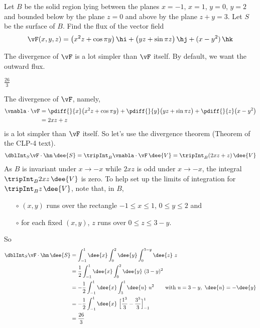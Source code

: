 \begin{question}[M317 2006A] %
Let $B$ be the solid region lying between the planes $x=-1$,
$x=1$, $y=0$, $y=2$ and bounded below by the plane $z=0$ and above 
by the plane $z+y=3$. Let $S$ be the surface of $B$. Find the flux 
of the vector field
\begin{equation*}
\vF(x,y,z) =  \big(x^2 z +\cos \pi y\big)\,\hi
             +\big(yz +\sin \pi z\big)\,\hj
             +(x-y^2)\,\hk
\end{equation*}
\end{question}

\begin{hint} 
The divergence of $\vF$ is a lot simpler than $\vF$ itself.
By default, we want the outward flux.
\end{hint}

\begin{answer} 
$\frac{26}{3}$
\end{answer}

\begin{solution}
The divergence of $\vF$, namely,
\begin{align*}
\vnabla\cdot\vF &= 
    \pdiff{}{x}\big(x^2 z +\cos \pi y\big)
     +\pdiff{}{y}\big(yz +\sin \pi z\big)
     +\pdiff{}{z}\big(x-y^2\big) \\
  &=2xz +z
\end{align*}
is a lot simpler than $\vF$ itself. So let's use the divergence theorem
(Theorem  of the CLP-4 text). 
\begin{align*}
\dblInt_S \vF \cdot \hn\,\dee{S}
=\tripInt_B \vnabla\cdot\vF\,\dee{V}
=\tripInt_B (2xz+z)\,\dee{V}
\end{align*}
As $B$ is invariant under $x\rightarrow-x$ while $2xz$ is odd under 
$x\rightarrow-x$, the integral $\tripInt_B 2xz\,\dee{V}$ is zero.
To help set up the limits of integration for $\tripInt_B z\,\dee{V}$,
note that, in $B$,
\begin{itemize}\itemsep1pt \parskip0pt  %
\item[$\circ$]
$(x,y)$ runs over the rectangle $-1\le x\le 1$, $0\le y\le 2$ and
\item[$\circ$]
for each fixed $(x,y)$, $z$ runs over $0\le z\le 3-y$.
\end{itemize}
So
\begin{align*}
\dblInt_S \vF \cdot \hn\,\dee{S}
&= \int_{-1}^1\dee{x}\int_0^2\dee{y}\int_0^{3-y}\dee{z}\ z \\
&= \frac{1}{2}\int_{-1}^1\dee{x}\int_0^2\dee{y}\ (3-y)^2 \\
&=-\frac{1}{2}\int_{-1}^1\dee{x}\int_3^1\dee{u}\ u^2 \qquad
\text{with } u = 3-y,\ \dee{u}=-\dee{y} \\
&=-\frac{1}{2}\int_{-1}^1\dee{x}\ 
       \Big[\frac{1^3}{3} - \frac{3^3}{3}\Big]_{-1}^1\\
&=\frac{26}{3}
\end{align*}

\end{solution}

